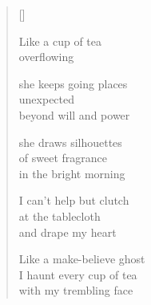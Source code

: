 \documentclass[11pt,a4paper]{article}
\begin{document}
\thispagestyle{empty}

\poemtitle{}

\settowidth{\versewidth}{Like a make-believe ghost}

\bigskip

\begin{verse}[\versewidth]

Like a cup of tea\\
overflowing

she keeps going places\\
unexpected\\
beyond will and power

she draws silhouettes\\
of sweet fragrance\\
in the bright morning

I can't help but clutch\\
at the tablecloth\\
and drape my heart

Like a make-believe ghost\\
I haunt every cup of tea\\
with my trembling face
\end{verse}
\end{document}
